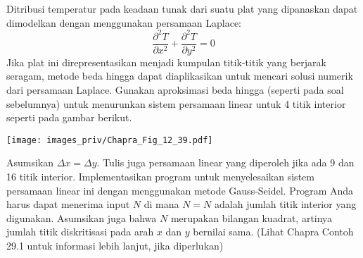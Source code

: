 \begin{soal}
Ditribusi temperatur pada keadaan tunak dari suatu plat yang dipanaskan
dapat dimodelkan dengan menggunakan persamaan Laplace:
\begin{equation*}
\frac{\partial^2 T}{\partial x^2} + \frac{\partial^2 T}{\partial y^2} = 0
\end{equation*}
Jika plat ini direpresentasikan menjadi kumpulan titik-titik yang berjarak
seragam, metode beda hingga dapat diaplikasikan untuk mencari solusi numerik
dari persamaan Laplace. Gunakan aproksimasi beda hingga (seperti pada soal
sebelumnya) untuk menurunkan sistem persamaan linear untuk 4 titik interior
seperti pada gambar berikut.

{\centering
\texttt{[image: images\_priv/Chapra\_Fig\_12\_39.pdf]}
\par}

Asumsikan $\Delta x = \Delta y$. Tulis juga persamaan linear yang diperoleh
jika ada 9 dan 16 titik interior. 
Implementasikan program untuk menyelesaikan sistem persamaan linear
ini dengan menggunakan metode Gauss-Seidel. Program Anda harus dapat menerima input
$N$ di mana $N = N$ adalah jumlah titik interior yang digunakan. Asumsikan juga bahwa $N$
merupakan bilangan kuadrat, artinya jumlah titik diskritisasi pada arah $x$ dan $y$
bernilai sama.
(Lihat Chapra Contoh 29.1 untuk informasi lebih lanjut, jika diperlukan)
\end{soal}

